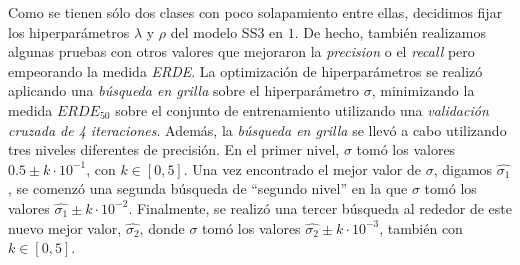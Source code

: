 Como se tienen sólo dos clases con poco solapamiento entre ellas, decidimos fijar los hiperparámetros $\lambda$ y $\rho$ del modelo SS3 en $1$. De hecho, también realizamos algunas pruebas con otros valores que mejoraron la \emph{precision} o el \emph{recall} pero empeorando la medida \emph{ERDE}.
La optimización de hiperparámetros se realizó aplicando una \emph{búsqueda en grilla} sobre el hiperparámetro $\sigma$, minimizando la medida $ERDE_{50}$ sobre el conjunto de entrenamiento utilizando una \emph{validación cruzada de 4 iteraciones}. Además, la \emph{búsqueda en grilla} se llevó a cabo utilizando tres niveles diferentes de precisión. En el primer nivel, $\sigma$ tomó los valores $0.5\pm k\cdot10^{-1}$, con $k\in [0, 5]$. Una vez encontrado el mejor valor de $\sigma$, digamos $\widehat{\sigma_1}$, se comenzó una segunda búsqueda de ``segundo nivel'' en la que $\sigma$ tomó los valores $\widehat{\sigma_1}\pm k\cdot10^{-2}$. Finalmente, se realizó una tercer búsqueda al rededor de este nuevo mejor valor, $\widehat{\sigma_2}$, donde $\sigma$ tomó los valores $\widehat{\sigma_2}\pm k\cdot10^{-3}$, también con $k\in [0, 5]$.

